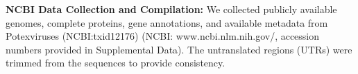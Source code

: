\documentclass{article}
\begin{document}


\textbf{NCBI Data Collection and Compilation:}
We collected publicly available genomes, complete proteins, gene annotations, and available metadata from Potexviruses (NCBI:txid12176) (NCBI: www.ncbi.nlm.nih.gov/, accession numbers provided in Supplemental Data). The untranslated regions (UTRs) were trimmed from the sequences to provide consistency.
\end{document}

